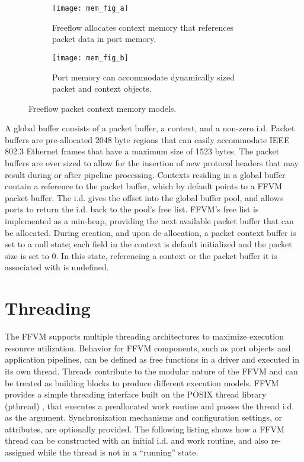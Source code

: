 \begin{figure}[h]
  \centering
  \begin{subfigure}[b]{0.48\textwidth}
    \centering
    \texttt{[image: mem\_fig\_a]}
    \caption{Freeflow allocates context memory that references packet data
    in port memory.}
  \end{subfigure}
  \hfill
  \begin{subfigure}[b]{0.48\textwidth}
    \centering
    \texttt{[image: mem\_fig\_b]}
    \caption{Port memory can accommodate dynamically sized packet and context
    objects.}
  \end{subfigure}
  \caption{Freeflow packet context memory models.}
  \label{mem_model}
\end{figure}

A global buffer consists of a packet buffer, a context, and a non-zero
i.d. Packet buffers are pre-allocated 2048 byte regions that can easily
accommodate IEEE 802.3 Ethernet frames that have a maximum size of 1523 bytes.
The packet buffers are over sized to allow for the insertion of new protocol
headers that may result during or after pipeline processing. Contexts residing
in a global buffer contain a reference to the packet buffer, which by default
points to a FFVM packet buffer. The i.d. gives the offset into the global buffer
pool, and allows ports to return the i.d. back to the pool's free list. FFVM's
free list is implemented as a min-heap, providing the next available packet
buffer that can be allocated. During creation, and upon de-allocation, a packet
context buffer is set to a null state; each field in the context is default
initialized and the packet size is set to 0. In this state, referencing a
context or the packet buffer it is associated with is undefined.


\section{Threading}
\label{vm:threading}
The FFVM supports multiple threading architectures to maximize execution
resource utilization. Behavior for FFVM components, such as port objects and
application pipelines, can be defined as free functions in a driver and
executed in its own thread. Threads contribute to the modular nature of the
FFVM and can be treated as building blocks to produce different execution
models. FFVM provides a simple threading interface built on the POSIX thread
library (pthread) \cite{pthread}, that executes a preallocated work routine
and passes the thread i.d. as the argument. Synchronization mechanisms and
configuration settings, or attributes, are optionally provided. The following
listing shows how a FFVM thread can be constructed with an initial i.d. and work
routine, and also re-assigned while the thread is not in a ``running'' state.

